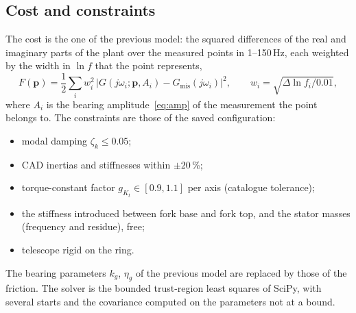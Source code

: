 \documentclass[10pt,a4paper]{article}
\numberwithin{equation}{section}
\begin{document}
\subsection{Cost and constraints}
The cost is the one of the previous model: the squared differences of the real and imaginary parts of the plant over the measured points in 1--150\,Hz, each weighted by the width in $\ln f$ that the point represents,
\begin{equation}
F(\mathbf p)=\frac12\sum_i w_i^2\,\bigl|G(j\omega_i;\mathbf p,A_i)-G_\mathrm{mis}(j\omega_i)\bigr|^2,\qquad w_i=\sqrt{\Delta\ln f_i/0.01},
\end{equation}
where $A_i$ is the bearing amplitude~\eqref{eq:amp} of the measurement the point belongs to. The constraints are those of the saved configuration:
\begin{itemize}
\item modal damping $\zeta_k\leq0.05$;
\item CAD inertias and stiffnesses within $\pm20$\,\%;
\item torque-constant factor $g_{K_t}\in[0.9,1.1]$ per axis (catalogue tolerance);
\item the stiffness introduced between fork base and fork top, and the stator masses (frequency and residue), free;
\item telescope rigid on the ring.
\end{itemize}
The bearing parameters $k_g$, $\eta_g$ of the previous model are replaced by those of the friction. The solver is the bounded trust-region least squares of SciPy, with several starts and the covariance computed on the parameters not at a bound.
\end{document}
